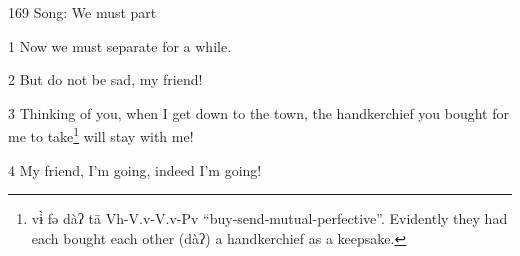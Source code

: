 
169 Song: We must part

1 Now we must separate for a while.

2 But do not be sad, my friend!

3 Thinking of you, when I get down to the town, the handkerchief you bought for
me to take\footnote{vɨ̀ fə dàʔ tā Vh-V.v-V.v-Pv ``buy-send-mutual-perfective''. Evidently they had each bought each other (dàʔ) a handkerchief as a keepsake.} will stay with me!

4 My friend, I'm going, indeed I'm going!

